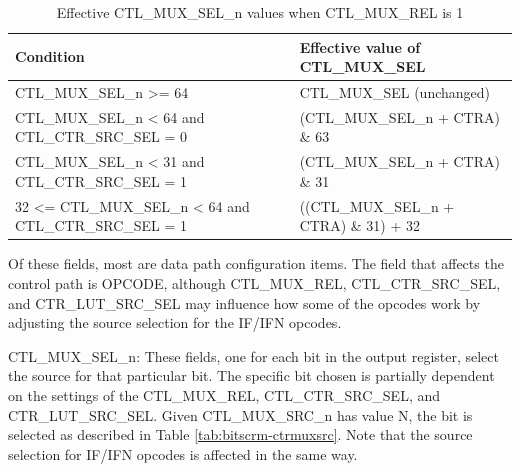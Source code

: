 \documentclass[main\_\_EN.tex]{subfiles}
\begin{document}
\begin{table}[H]
\centering
\caption{Effective CTL\_MUX\_SEL\_n values when CTL\_MUX\_REL is 1}
\label{tab:bitscrm-ctrmuxrel}
\begin{tabular}{|l|l|}
\hline\rowcolor{lightgray}
Condition & Effective value of CTL\_MUX\_SEL \\
\hline
CTL\_MUX\_SEL\_n >= 64 & CTL\_MUX\_SEL (unchanged) \\
CTL\_MUX\_SEL\_n < 64 and CTL\_CTR\_SRC\_SEL = 0 & (CTL\_MUX\_SEL\_n + CTRA) \& 63 \\
CTL\_MUX\_SEL\_n < 31 and CTL\_CTR\_SRC\_SEL = 1 & (CTL\_MUX\_SEL\_n + CTRA) \& 31 \\
32 <= CTL\_MUX\_SEL\_n < 64 and CTL\_CTR\_SRC\_SEL = 1 & ((CTL\_MUX\_SEL\_n + CTRA) \& 31) + 32 \\
\hline
\end{tabular}
\end{table}


Of these fields, most are data path configuration items. The field that affects the control path is OPCODE, although CTL\_MUX\_REL, CTL\_CTR\_SRC\_SEL, and CTR\_LUT\_SRC\_SEL may influence how some of the opcodes work by adjusting the source selection for the IF/IFN opcodes.

CTL\_MUX\_SEL\_n: These fields, one for each bit in the output register, select the source for that particular bit. The specific bit chosen is partially dependent on the settings of the CTL\_MUX\_REL, CTL\_CTR\_SRC\_SEL, and CTR\_LUT\_SRC\_SEL. Given CTL\_MUX\_SRC\_n has value N, the bit is selected as described in Table \ref{tab:bitscrm-ctrmuxsrc}. Note that the source selection for IF/IFN opcodes is affected in the same way.
\end{document}
